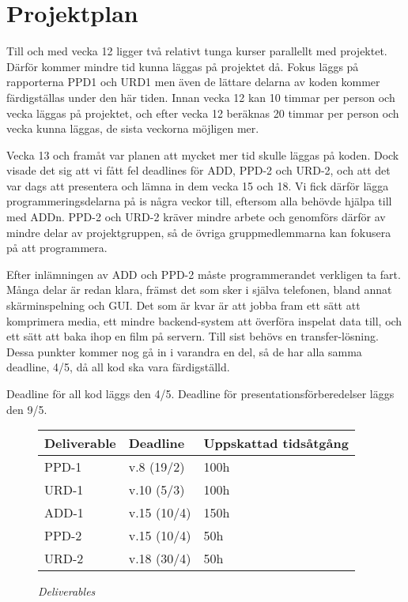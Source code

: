 
\section{Projektplan}
\label{sec:projektplan}
Till och med vecka 12 ligger två relativt tunga kurser parallellt med projektet. Därför kommer mindre tid kunna läggas på projektet då. Fokus läggs på rapporterna PPD1 och URD1 men även de lättare delarna av koden kommer färdigställas under den här tiden. Innan vecka 12 kan 10 timmar per person och vecka läggas på projektet, och efter vecka 12 beräknas 20 timmar per person och vecka kunna läggas, de sista veckorna möjligen mer.

Vecka 13 och framåt var planen att mycket mer tid skulle läggas på koden. Dock visade det sig att vi fått fel deadlines för ADD, PPD-2 och URD-2, och att det var dags att presentera och lämna in dem vecka 15 och 18. Vi fick därför lägga programmeringsdelarna på is några veckor till, eftersom alla behövde hjälpa till med ADDn. PPD-2 och URD-2 kräver mindre arbete och genomförs därför av mindre delar av projektgruppen, så de övriga gruppmedlemmarna kan fokusera på att programmera.

Efter inlämningen av ADD och PPD-2 måste programmerandet verkligen ta fart. Många delar är redan klara, främst det som sker i själva telefonen, bland annat skärminspelning och GUI. Det som är kvar är att jobba fram ett sätt att komprimera media, ett mindre backend-system att överföra inspelat data till, och ett sätt att baka ihop en film på servern. Till sist behövs en transfer-lösning. Dessa punkter kommer nog gå in i varandra en del, så de har alla samma deadline, 4/5, då all kod ska vara färdigställd. 


Deadline för all kod läggs den 4/5. Deadline för presentationsförberedelser läggs den 9/5. 

\begin{figure}[H]
\centering
\begin{tabular}{ | l | l | l |}
  \hline
  \textbf{Deliverable} & \textbf{Deadline} & \textbf{Uppskattad tidsåtgång} \\ \hline
  PPD-1 & v.8 (19/2) & 100h \\ \hline
  URD-1 & v.10 (5/3) & 100h \\ \hline
  ADD-1 & v.15 (10/4) & 150h \\ \hline
  PPD-2 & v.15 (10/4) & 50h \\ \hline
  URD-2 & v.18 (30/4) & 50h \\ \hline
\end{tabular}
\caption*{\textit{Deliverables}}
\end{figure}

